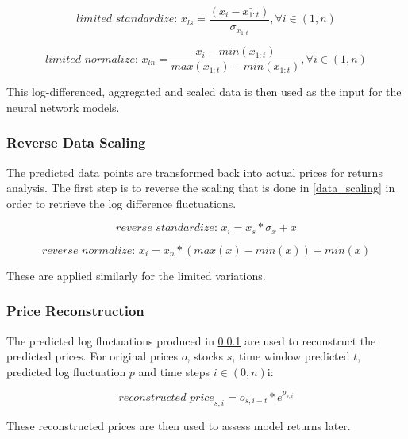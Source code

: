 \documentclass[a4paper,latin]{paper}
\begin{document}
\begin{equation}
\textit{limited standardize:  } x_{ls} = \frac{(x_i - \bar{x_{1:t}}) }{\sigma_{x_{1:t}}} , \forall  i \in (1, n)
\end{equation}

\begin{equation}
\textit{limited normalize:  } x_{ln} = \frac{x_i - min(x_{1:t}) }{max(x_{1:t}) - min(x_{1:t})} , \forall  i \in (1, n)
\end{equation}


This log-differenced, aggregated and scaled data is then used as the input for the neural network models.

\subsubsection{Reverse Data Scaling}\label{data_reverse_scaling}

The predicted data points are transformed back into actual prices for returns analysis. The first step is to reverse the scaling that is done in \ref{data_scaling} in order to retrieve the log difference fluctuations.

\begin{equation}
\textit{reverse standardize:  }x_i = x_s * \sigma_x + \bar{x}
\end{equation}

\begin{equation}
\textit{reverse normalize:  } x_i = x_n * (max(x) - min(x)) + min(x)
\end{equation}

These are applied similarly for the limited variations.

\subsubsection{Price Reconstruction}\label{data_price_recon}

The predicted log fluctuations produced in \ref{data_reverse_scaling} are used to reconstruct the predicted prices. For original prices $o$, stocks $s$, time window predicted $t$, predicted log fluctuation $p$ and time steps $i \in (0, n)$i:

\begin{equation}
\textit{reconstructed price}_{s,i} = o_{s,i-t} * e^{p_{s,i}}
\end{equation}

These reconstructed prices are then used to assess model returns later.
\end{document}
